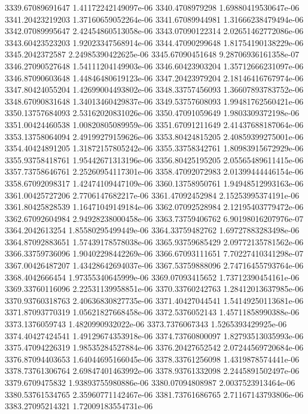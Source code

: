 {3339.67089691647 1.41172242149097e-06
3340.4708979298 1.69880419530647e-06
3341.20423219203 1.37160659052264e-06
3341.67089944981 1.31666238479494e-06
3342.07089995647 2.42454860513058e-06
3343.07090122314 2.02651462772086e-06
3343.60423523203 1.92023347568914e-06
3344.47090299648 1.81754190138229e-06
3345.2042372587 2.24985390422625e-06
3345.67090451648 9.28706936161358e-07
3346.27090527648 1.54111204149903e-06
3346.60423903204 1.35712666231097e-06
3346.87090603648 1.44846480619123e-06
3347.20423979204 2.18146416767974e-06
3347.80424055204 1.42699004493802e-06
3348.33757456093 1.36607893783752e-06
3348.67090831648 1.34013460429837e-06
3349.53757608093 1.99481762560421e-06
3350.13757684093 2.53162020831026e-06
3350.47091059649 1.9803309372198e-06
3351.00424460538 1.00820805089959e-06
3351.67091211649 2.41437688187064e-06
3353.13758064094 2.49199279159626e-06
3353.80424815205 2.40859399275001e-06
3354.40424891205 1.31872157805242e-06
3355.33758342761 1.80983915672929e-06
3355.93758418761 1.95442671313196e-06
3356.80425195205 2.05565489611415e-06
3357.73758646761 2.25260954117301e-06
3358.47092072983 2.01399444446154e-06
3358.67092098317 1.42474109447109e-06
3360.13758950761 1.94948512993163e-06
3361.00425727206 2.7706147682217e-06
3361.47092452984 2.15253995374191e-06
3361.80425828539 1.16471049149184e-06
3362.07092528984 2.12195403779472e-06
3362.67092604984 2.94928238000458e-06
3363.73759406762 6.90198016207976e-07
3364.2042613254 1.85580295499449e-06
3364.33759482762 1.69727883283498e-06
3364.87092883651 1.57439178578038e-06
3365.93759685429 2.09772135781562e-06
3366.33759736096 1.90402298442269e-06
3366.67093111651 7.70227410341298e-07
3367.00426487207 1.43428642694037e-06
3367.53759888096 2.74716455793764e-06
3368.4042666454 1.97355340645999e-06
3369.07093415652 1.73712390454161e-06
3369.33760116096 2.22531139958851e-06
3370.33760242763 1.28412013637985e-06
3370.93760318763 2.40636830827735e-06
3371.40427044541 1.54149250113681e-06
3371.87093770319 1.05621827668458e-06
3372.5376052143 1.45711858990388e-06
3373.1376059743 1.4820990932022e-06
3373.7376067343 1.5265393429925e-06
3374.40427424541 1.49129674353918e-06
3374.73760800097 1.82793513035993e-06
3375.47094226319 1.98535284527884e-06
3376.20427652542 2.07244569720684e-06
3376.87094403653 1.64044695166045e-06
3378.33761256098 1.4319878574441e-06
3378.73761306764 2.69847401463992e-06
3378.93761332098 2.2445891502497e-06
3379.6709475832 1.93893755980886e-06
3380.07094808987 2.0037523913464e-06
3380.53761534765 2.35960771142467e-06
3381.73761686765 2.71167143793806e-06
3383.27095214321 1.72009183554731e-06
}
